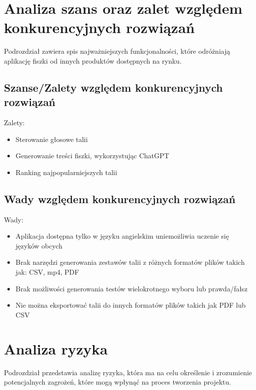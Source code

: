 \section{Analiza szans oraz zalet względem konkurencyjnych rozwiązań}

Podrozdział zawiera spis najważniejszych funkcjonalności, które odróżniają aplikację fiszki od innych produktów dostępnych na rynku.

\subsection{Szanse/Zalety względem konkurencyjnych rozwiązań}

Zalety:
\begin{itemize}[label=-]
    \item Sterowanie głosowe talii
    \item Generowanie treści fiszki, wykorzystując ChatGPT
    \item Ranking najpopularniejszych talii
\end{itemize}

\subsection{Wady względem konkurencyjnych rozwiązań}

Wady:
\begin{itemize}[label=-]
    \item Aplikacja dostępna tylko w języku angielskim uniemożliwia uczenie się języków obcych
    \item Brak narzędzi generowania zestawów talii z różnych formatów plików takich jak: CSV, mp4, PDF
    \item Brak możliwości generowania testów wielokrotnego wyboru lub prawda/fałsz
    \item Nie można eksportować talii do innych formatów plików takich jak PDF lub CSV
\end{itemize}

\section{Analiza ryzyka}

Podrozdział przedstawia analizę ryzyka, która ma na celu określenie i zrozumienie potencjalnych zagrożeń, które mogą wpłynąć na proces tworzenia projektu.



